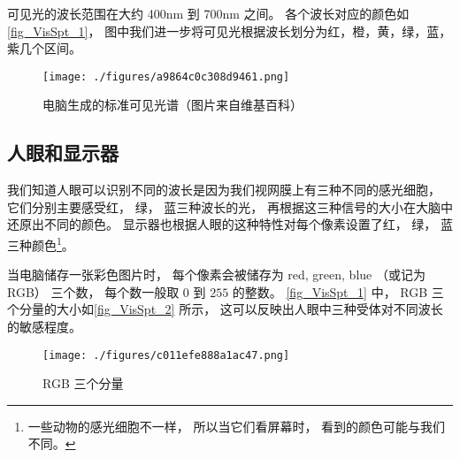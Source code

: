 
可见光的波长范围在大约 400nm 到 700nm 之间。 各个波长对应的颜色如\autoref{fig_VisSpt_1}， 图中我们进一步将可见光根据波长划分为红，橙，黄，绿，蓝，紫几个区间。

\begin{figure}[ht]
\centering
\texttt{[image: ./figures/a9864c0c308d9461.png]}
\caption{电脑生成的标准可见光谱（图片来自维基百科）} \label{fig_VisSpt_1}
\end{figure}

\subsection{人眼和显示器}
我们知道人眼可以识别不同的波长是因为我们视网膜上有三种不同的感光细胞， 它们分别主要感受红， 绿， 蓝三种波长的光， 再根据这三种信号的大小在大脑中还原出不同的颜色。 显示器也根据人眼的这种特性对每个像素设置了红， 绿， 蓝三种颜色\footnote{一些动物的感光细胞不一样， 所以当它们看屏幕时， 看到的颜色可能与我们不同。}。

当电脑储存一张彩色图片时， 每个像素会被储存为 red, green, blue （或记为 RGB） 三个数， 每个数一般取 $0$ 到 $255$ 的整数。 \autoref{fig_VisSpt_1} 中， RGB 三个分量的大小如\autoref{fig_VisSpt_2} 所示， 这可以反映出人眼中三种受体对不同波长的敏感程度。

\begin{figure}[ht]
\centering
\texttt{[image: ./figures/c011efe888a1ac47.png]}
\caption{RGB 三个分量} \label{fig_VisSpt_2}
\end{figure}
